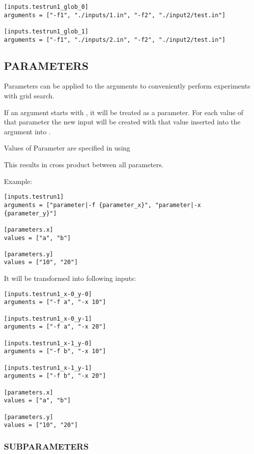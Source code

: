 \documentclass[a4paper,english]{article}
\begin{document}
\begin{adjustwidth}{18pt}{0pt}
      \begin{verbatim}
[inputs.testrun1_glob_0]
arguments = ["-f1", "./inputs/1.in", "-f2", "./input2/test.in"]

[inputs.testrun1_glob_1]
arguments = ["-f1", "./inputs/2.in", "-f2", "./input2/test.in"]
      \end{verbatim}

      \subsection{PARAMETERS}

        Parameters can be applied to the arguments to conveniently perform experiments with grid search.

            If an argument starts with , it will be treated as a parameter.
            For each value of that parameter the new input will be created with that value inserted into the argument
            into .

            Values of Parameter are specified in  using 

            This results in cross product between all parameters.

                Example:

        \begin{verbatim}
[inputs.testrun1]
arguments = ["parameter|-f {parameter_x}", "parameter|-x {parameter_y}"]

[parameters.x]
values = ["a", "b"]

[parameters.y]
values = ["10", "20"]
        \end{verbatim}

                It will be transformed into following inputs:

        \begin{verbatim}
[inputs.testrun1_x-0_y-0]
arguments = ["-f a", "-x 10"]

[inputs.testrun1_x-0_y-1]
arguments = ["-f a", "-x 20"]

[inputs.testrun1_x-1_y-0]
arguments = ["-f b", "-x 10"]

[inputs.testrun1_x-1_y-1]
arguments = ["-f b", "-x 20"]

[parameters.x]
values = ["a", "b"]

[parameters.y]
values = ["10", "20"]
        \end{verbatim}

    \subsubsection{SUBPARAMETERS}


\end{adjustwidth}
\end{document}
